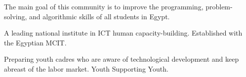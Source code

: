 





The main goal of this community is to improve the programming, problem-solving, and algorithmic skills of all students in Egypt.

\divider

A leading national institute in ICT human capacity-building. Established with the Egyptian MCIT.

\divider

Preparing youth cadres who are aware of technological development and keep abreast of the labor market. Youth Supporting Youth.